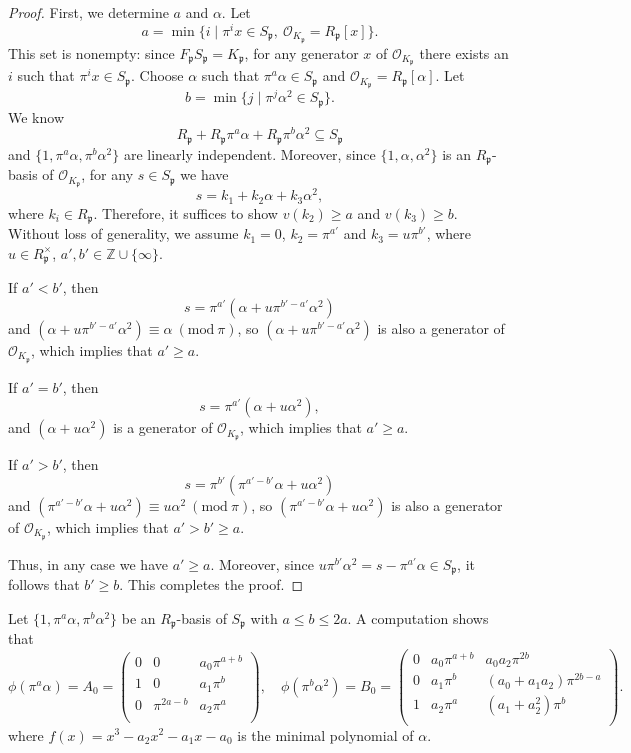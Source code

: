 \documentclass[12pt]{article}
\theoremstyle{plain}
\theoremstyle{definition}
\theoremstyle{remark}
\begin{document}
\begin{proof}
First, we determine $a$ and $\alpha$. Let
$$
a=\min \{ i\mid \pi^ix\in S_\mathfrak{p},\ \mathcal{O}_{K_\mathfrak{p}}=R_\mathfrak{p}[x]\}.
$$
This set is nonempty: since $F_\mathfrak{p}S_\mathfrak{p}=K_\mathfrak{p}$, for any generator $x$ of $\mathcal{O}_{K_\mathfrak{p}}$ there exists an $i$ such that $\pi^ix\in S_\mathfrak{p}$. Choose $\alpha$ such that $\pi^a\alpha\in S_\mathfrak{p}$ and $\mathcal{O}_{K_\mathfrak{p}}=R_\mathfrak{p}[\alpha]$. Let
$$
b=\min \{ j\mid \pi^j\alpha^2\in S_\mathfrak{p}\}.
$$
We know
$$
R_\mathfrak{p}+R_\mathfrak{p}\pi^a\alpha+R_\mathfrak{p}\pi^b\alpha^2\subseteq S_\mathfrak{p}
$$
and $\{1,\pi^a\alpha,\pi^b\alpha^2\}$ are linearly independent. Moreover, since $\{1,\alpha,\alpha^2\}$ is an $R_\mathfrak{p}$-basis of $\mathcal{O}_{K_\mathfrak{p}}$, for any $s\in S_\mathfrak{p}$ we have
$$
s = k_1+k_2\alpha+k_3\alpha^2,
$$
where $k_i\in R_\mathfrak{p}$. Therefore, it suffices to show $v(k_2)\geq a$ and $v(k_3)\geq b$. Without loss of generality, we assume $k_1 = 0$, $k_2 = \pi^{a'}$ and $k_3=u\pi^{b'}$, where $u\in R_\mathfrak{p}^\times$, $a',b'\in \mathbb{Z}\cup \{\infty\}$.

If $a'<b'$, then
$$
s=\pi^{a'}(\alpha+u\pi^{b'-a'}\alpha^2)
$$
and $(\alpha+u\pi^{b'-a'}\alpha^2)\equiv\alpha\ (\mathrm{mod}\ \pi)$, so $(\alpha+u\pi^{b'-a'}\alpha^2)$ is also a generator of $\mathcal{O}_{K_\mathfrak{p}}$, which implies that $a'\geq a$.

If $a'=b'$, then
$$
s=\pi^{a'}(\alpha+u\alpha^2),
$$
and $(\alpha+u\alpha^2)$ is a generator of $\mathcal{O}_{K_\mathfrak{p}}$, which implies that $a'\geq a$.

If $a'>b'$, then
$$
s=\pi^{b'}(\pi^{a'-b'}\alpha+u\alpha^2)
$$
and $(\pi^{a'-b'}\alpha+u\alpha^2)\equiv u\alpha^2\ (\mathrm{mod}\ \pi)$, so $(\pi^{a'-b'}\alpha+u\alpha^2)$ is also a generator of $\mathcal{O}_{K_\mathfrak{p}}$, which implies that $a'>b'\geq a$.

Thus, in any case we have $a'\geq a$. Moreover, since $u\pi^{b'}\alpha^2=s-\pi^{a'}\alpha\in S_\mathfrak{p}$, it follows that $b'\geq b$. This completes the proof.
\end{proof}
 
Let $\{1, \pi^a\alpha, \pi^b\alpha^2\}$ be an $R_\mathfrak{p}$-basis of $S_\mathfrak{p}$ with $a\leq b\leq 2a$. A computation shows that 
$$
\phi(\pi^a\alpha)=A_0=\begin{pmatrix}
0 & 0    &   a_0\pi^{a+b}   \\
1 &   0   & a_1\pi^{b}\\
 0 &   \pi^{2a-b}    &   a_2\pi^{a}   \\
\end{pmatrix},
\quad
\phi(\pi^b\alpha^2)=B_0=\begin{pmatrix}
0 & a_0\pi^{a+b}    &   a_0a_2\pi^{2b}   \\
0 &   a_1\pi^{b}   & (a_0+a_1a_2)\pi^{2b-a}\\
1 &   a_2\pi^{a}    &   (a_1+a_2^2)\pi^{b}   \\
\end{pmatrix}.
$$
where $f(x)=x^3-a_2x^2-a_1x-a_0$ is the minimal polynomial of $\alpha$.
\end{document}
